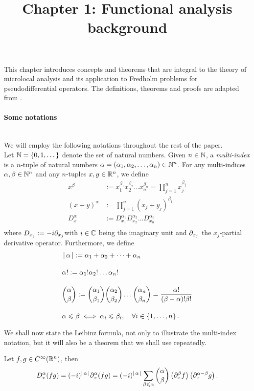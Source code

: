 \documentclass[12pt]{article}
\title{Chapter 1: Functional analysis background}
\date{}
\begin{document}
\maketitle

This chapter introduces concepts and theorems that are integral to the theory of microlocal analysis and its application to Fredholm problems for pseudodifferential operators. The definitions, theorems and proofs are adapted from \cite{Reed1972-zk, taylor_pde, rbm_differential_analysis}. 

\paragraph{Some notations} \hfill \\
We will employ the following notations throughout the rest of the paper. \\

Let ${\mathbb N} = \left\{0, 1, \dots\right\}$ denote the set of natural numbers. Given $n \in {\ensuremath {\mathbb N}}$, a \textit{multi-index} is a $n$-tuple of natural numbers $\alpha = (\alpha_1, \alpha_2, \dots, \alpha_n) \in {\ensuremath {\mathbb N}}^n$. For any multi-indices $\alpha, \beta \in {\ensuremath {\mathbb N}}^n$ and  any $n$-tuples $x, y \in {\ensuremath {\mathbb R}}^n$, we define
\begin{align*}
x^\beta &:= x_1^{\beta_1} x_2^{\beta_2}\dots x_n^{\beta_n} = \prod_{j = 1}^n x_j^{\beta_j}\\
 (x + y)^\alpha &:= \prod_{j = 1}^n (x_j + y_j)^{\beta_j} \\
D^\alpha_x &:= D_{x_1}^{\alpha_1} D_{x_2}^{\alpha_2} \dots D_{x_n}^{\alpha_n}\\
\end{align*}
where $D_{x_j} := - i \partial_{x_j}$with $i \in {\ensuremath {\mathbb C}}$ being the imaginary unit and $\partial_{x_j} $ the $x_j$-partial derivative operator. Furthermore, we define
\begin{align*}
&\left|\, \alpha\,\right| := \alpha_1 + \alpha_2 + \dots + \alpha_n\\[1em]
& \alpha! := \alpha_1! \alpha_2! \dots \alpha_n! \\[1em]
& \binom{\alpha}{\beta} := \binom{\alpha_1}{\beta_1} \binom{\alpha_2}{ \beta_2} \dots \binom{\alpha_n}{\beta_n} = \frac{\alpha!}{(\beta - \alpha)! \beta!} \\[1em]
&\alpha \leqslant \beta \iff \alpha_i \leqslant \beta_i, \quad \forall i \in \left\{1, \dots, n\right\}. 
\end{align*}

We shall now state the Leibinz formula, not only to illustrate the multi-index notation, but it will also be a theorem that we shall use repeatedly. 
\begin{ftheorem} \label{theorem: leibinz formula}
    Let $f, g \in C^\infty({\mathbb R}^n)$, then 
    \begin{align*}
    D^\alpha_x (fg) = (-i)^{\left|\, \alpha\,\right|} \partial_x^\alpha(fg) = (-i)^{\left|\, \alpha\,\right|} \sum_{\beta \leqslant \alpha} \binom{\alpha}{\beta}  \left(\partial_x^\beta f\right) \left(\partial_x^{\alpha - \beta}g\right). 
    \end{align*}
\end{ftheorem}
\end{document}
